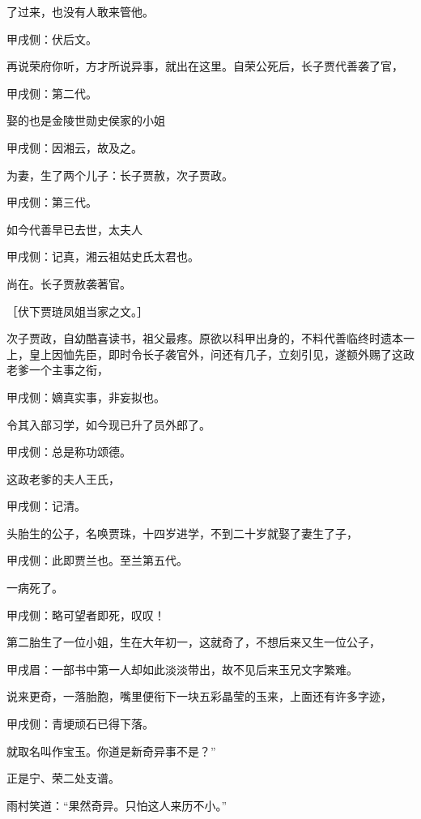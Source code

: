 \begin{parag}
了过来，也没有人敢来管他。\begin{note}甲戌侧：伏后文。\end{note}再说荣府你听，方才所说异事，就出在这里。自荣公死后，长子贾代善袭了官，\begin{note}甲戌侧：第二代。\end{note}娶的也是金陵世勋史侯家的小姐\begin{note}甲戌侧：因湘云，故及之。\end{note}为妻，生了两个儿子：长子贾赦，次子贾政。\begin{note}甲戌侧：第三代。\end{note}如今代善早已去世，太夫人\begin{note}甲戌侧：记真，湘云祖姑史氏太君也。\end{note}尚在。长子贾赦袭著官。\begin{note}［伏下贾琏凤姐当家之文。］\end{note}次子贾政，自幼酷喜读书，祖父最疼。原欲以科甲出身的，不料代善临终时遗本一上，皇上因恤先臣，即时令长子袭官外，问还有几子，立刻引见，遂额外赐了这政老爹一个主事之衔，\begin{note}甲戌侧：嫡真实事，非妄拟也。\end{note}令其入部习学，如今现已升了员外郎了。\begin{note}甲戌侧：总是称功颂德。\end{note}这政老爹的夫人王氏，\begin{note}甲戌侧：记清。\end{note}头胎生的公子，名唤贾珠，十四岁进学，不到二十岁就娶了妻生了子，\begin{note}甲戌侧：此即贾兰也。至兰第五代。\end{note}一病死了。\begin{note}甲戌侧：略可望者即死，叹叹！\end{note}第二胎生了一位小姐，生在大年初一，这就奇了，不想后来又生一位公子，\begin{note}甲戌眉：一部书中第一人却如此淡淡带出，故不见后来玉兄文字繁难。\end{note}说来更奇，一落胎胞，嘴里便衔下一块五彩晶莹的玉来，上面还有许多字迹，\begin{note}甲戌侧：青埂顽石已得下落。\end{note}就取名叫作宝玉。你道是新奇异事不是？”\begin{note}正是宁、荣二处支谱。\end{note}
\end{parag}


\begin{parag}
    雨村笑道：“果然奇异。只怕这人来历不小。”
\end{parag}


